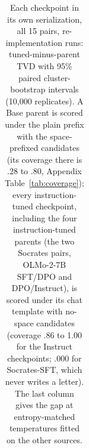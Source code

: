 \begin{table}[t]
\begin{tabular}{@{}llcccc@{}}
\bottomrule
\end{tabular}
\caption{Each checkpoint in its own serialization, all 15 pairs, re-implementation runs: tuned-minus-parent TVD with 95\% paired cluster-bootstrap intervals (10,000 replicates). A Base parent is scored under the plain prefix with the space-prefixed candidates (its coverage there is .28 to .80, Appendix Table~\ref{tab:coverage}); every instruction-tuned checkpoint, including the four instruction-tuned parents (the two Socrates pairs, OLMo-2-7B SFT/DPO and DPO/Instruct), is scored under its chat template with no-space candidates (coverage .86 to 1.00 for the Instruct checkpoints; .000 for Socrates-SFT, which never writes a letter). The last column gives the gap at entropy-matched temperatures fitted on the other sources.}
\label{tab:native-serialization-all}
\end{table}
